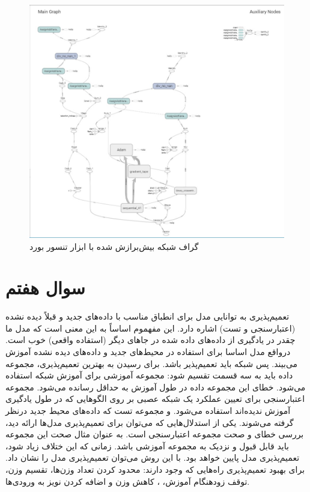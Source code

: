 \documentclass{article}
\begin{document}
\begin{figure}[!h]
    \centering\includegraphics[scale=.55]{./p6-6}
    \caption{گراف شبکه بیش‌برازش شده با ابزار تنسور بورد}\label{fig.66}
\end{figure}



\section{سوال هفتم}

تعمیم‌پذیری به توانایی مدل برای انطباق مناسب با داده‌های جدید و قبلاً دیده نشده (اعتبارسنجی و تست) اشاره دارد. این مفهموم اساساً به این معنی است که مدل ما چقدر در یادگیری از داده‌های داده شده در جاهای دیگر (استفاده واقعی) خوب است. درواقع مدل اساسا برای استفاده در محیط‌های جدید و داده‌های دیده نشده آموزش می‌بیند. پس شبکه باید تعمیم‌پذیر باشد.
برای رسیدن به بهترین تعمیم‌پذیری، مجموعه داده باید به سه قسمت تقسیم شود: مجموعه آموزشی برای آموزش شبکه استفاده می‌شود. خطای این مجموعه داده در طول آموزش به حداقل رسانده می‌شود. مجموعه اعتبارسنجی برای تعیین عملکرد یک شبکه عصبی بر روی الگوهایی که در طول یادگیری آموزش ندیده‌اند استفاده می‌شود. و مجموعه تست که داده‌های محیط جدید درنظر گرفته می‌شوند. یکی از استدلال‌هایی که می‌توان برای تعمیم‌پذیری مدل‌ها ارائه دید، بررسی خطای و صحت مجموعه اعتبارسنجی است. به عنوان مثال صحت این مجموعه باید قابل قبول و نزدیک به مجموعه آموزشی باشد. زمانی که این ختلاف زیاد شود، تعمیم‌پذیری مدل پایین خواهد بود. با این روش می‌توان تعمیم‌پذیری مدل را نشان داد.
برای بهبود تعمیم‌پذیری راه‌هایی که وجود دارند: محدود کردن تعداد وزن‌ها، تقسیم وزن، توقف زودهنگام آموزش، ، کاهش وزن و اضافه کردن نویز به ورودی‌ها.
\end{document}
